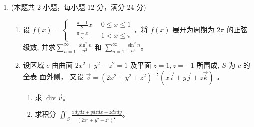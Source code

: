 \begin{enumerate}
{	
}


\newpage
\item 
(本题共 2 小题，每小题 12 分，满分 24 分)
\begin{enumerate}
	\item
	设 $f(x)=\left\{\begin{aligned}&\frac{\pi-1}{2} x \ & \ 0 \leqslant x \leqslant 1 \\ &\frac{\pi-x}{2} \ & \ 1<x \leqslant \pi\end{aligned}\right.$，将 $f(x)$ 展开为周期为 $2 \pi$ 的正弦级数, 并求$\sum\limits_{n=1}^{\infty} \frac{\sin ^{2} n}{n^{2}}$ 和 $\sum\limits_{n=1}^{\infty} \frac{\sin ^{2} n}{n^{4}}$。
	
	\item 
设区域 $c$ 由曲面 $2 x^{2}+y^{2}-z^{2}=1$ 及平面 $z=1, z=-1$ 所围成, $S$ 为 $c$ 的全表 面外侧， 又设 $\vec{v}=\left(2 x^{2}+y^{2}+z^{2}\right)^{-\frac{3}{2}}(x \vec{i}+y \vec{j}+z \vec{k})$ 。
\begin{enumerate}
	\item
求 $\operatorname{div} \vec{v}$。
	\item 
	求积分 $\iint_{S} \frac{x d y d z+y d z d x+z d x d y}{\left(2 x^{2}+y^{2}+z^{2}\right)^{\frac{3}{2}}}$。
\end{enumerate}
	
	
	
	
\end{enumerate}



\end{enumerate}
